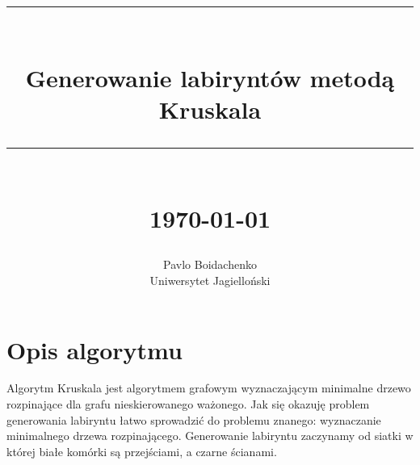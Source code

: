 \documentclass[12pt]{report}
\newcommand{\HRule}[1]{\rule{\linewidth}{#1}}
\begin{document}
\title{ \normalsize \textsc{}
		\\ [2.0cm]
		\HRule{0.5pt} \\
		\LARGE \textbf{{Generowanie labiryntów metodą Kruskala}}
		\HRule{2pt} \\ [0.5cm]
		\normalsize \today \vspace*{5\baselineskip}}

\date{}

\author{
		Pavlo Boidachenko \\ 
		Uniwersytet Jagielloński \\ }

\maketitle
\newpage
\renewcommand{\contentsname}{Spis treści}
\tableofcontents
\newpage

\sectionfont{\scshape}

\section{Opis algorytmu}
\par Algorytm Kruskala jest algorytmem grafowym wyznaczającym minimalne
drzewo rozpinające dla grafu nieskierowanego ważonego. Jak się okazuję 
problem generowania labiryntu łatwo sprowadzić do problemu znanego: 
wyznaczanie minimalnego drzewa rozpinającego. Generowanie labiryntu 
zaczynamy od siatki w której białe komórki są przejściami, 
a czarne ścianami.
\end{document}
